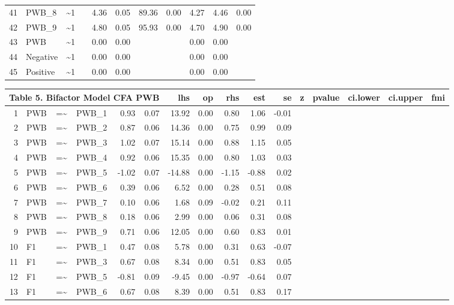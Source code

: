 \documentclass{article}
\begin{document}
\begin{table}[ht]
\begin{tabular}{rlllrrrrrrr}
  41 & PWB\_8 & \~{}1 &  & 4.36 & 0.05 & 89.36 & 0.00 & 4.27 & 4.46 & 0.00 \\ 
  42 & PWB\_9 & \~{}1 &  & 4.80 & 0.05 & 95.93 & 0.00 & 4.70 & 4.90 & 0.00 \\ 
  43 & PWB & \~{}1 &  & 0.00 & 0.00 &  &  & 0.00 & 0.00 &  \\ 
  44 & Negative & \~{}1 &  & 0.00 & 0.00 &  &  & 0.00 & 0.00 &  \\ 
  45 & Positive & \~{}1 &  & 0.00 & 0.00 &  &  & 0.00 & 0.00 &  \\ 
   \hline
\end{tabular}
\end{table}

\begin{table}[ht]
\centering
\begin{tabular}{rlllrrrrrrr}
 \multicolumn{ 6 }{l}{ Table 5. Bifactor Model CFA PWB} \cr 
  \hline
 & lhs & op & rhs & est & se & z & pvalue & ci.lower & ci.upper & fmi \\ 
  \hline
1 & PWB & =\~{} & PWB\_1 & 0.93 & 0.07 & 13.92 & 0.00 & 0.80 & 1.06 & -0.01 \\ 
  2 & PWB & =\~{} & PWB\_2 & 0.87 & 0.06 & 14.36 & 0.00 & 0.75 & 0.99 & 0.09 \\ 
  3 & PWB & =\~{} & PWB\_3 & 1.02 & 0.07 & 15.14 & 0.00 & 0.88 & 1.15 & 0.05 \\ 
  4 & PWB & =\~{} & PWB\_4 & 0.92 & 0.06 & 15.35 & 0.00 & 0.80 & 1.03 & 0.03 \\ 
  5 & PWB & =\~{} & PWB\_5 & -1.02 & 0.07 & -14.88 & 0.00 & -1.15 & -0.88 & 0.02 \\ 
  6 & PWB & =\~{} & PWB\_6 & 0.39 & 0.06 & 6.52 & 0.00 & 0.28 & 0.51 & 0.08 \\ 
  7 & PWB & =\~{} & PWB\_7 & 0.10 & 0.06 & 1.68 & 0.09 & -0.02 & 0.21 & 0.11 \\ 
  8 & PWB & =\~{} & PWB\_8 & 0.18 & 0.06 & 2.99 & 0.00 & 0.06 & 0.31 & 0.08 \\ 
  9 & PWB & =\~{} & PWB\_9 & 0.71 & 0.06 & 12.05 & 0.00 & 0.60 & 0.83 & 0.01 \\ 
  10 & F1 & =\~{} & PWB\_1 & 0.47 & 0.08 & 5.78 & 0.00 & 0.31 & 0.63 & -0.07 \\ 
  11 & F1 & =\~{} & PWB\_3 & 0.67 & 0.08 & 8.34 & 0.00 & 0.51 & 0.83 & 0.05 \\ 
  12 & F1 & =\~{} & PWB\_5 & -0.81 & 0.09 & -9.45 & 0.00 & -0.97 & -0.64 & 0.07 \\ 
  13 & F1 & =\~{} & PWB\_6 & 0.67 & 0.08 & 8.39 & 0.00 & 0.51 & 0.83 & 0.17 \\ 

\end{tabular}
\end{table}
\end{document}
